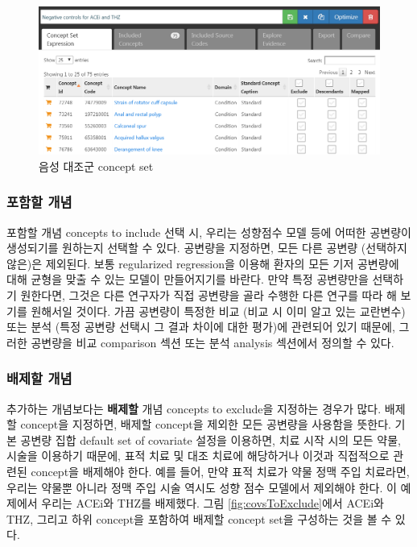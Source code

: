 \documentclass[10.5pt]{book}
\theoremstyle{definition}
\theoremstyle{definition}
\theoremstyle{definition}
\theoremstyle{remark}
\begin{document}
\begin{figure}

{\centering \includegraphics[width=1\linewidth]{images/PopulationLevelEstimation/ncConceptSet} 

}

\caption{음성 대조군 concept set}\label{fig:ncConceptSet}
\end{figure}

\subsubsection*{포함할 개념}\label{-}

포함할 개념 concepts to include 선택 시, 우리는 성향점수 모델 등에
어떠한 공변량이 생성되기를 원하는지 선택할 수 있다. 공변량을 지정하면,
모든 다른 공변량 (선택하지 않은)은 제외된다. 보통 regularized
regression을 이용해 환자의 모든 기저 공변량에 대해 균형을 맞출 수 있는
모델이 만들어지기를 바란다. 만약 특정 공변량만을 선택하기 원한다면,
그것은 다른 연구자가 직접 공변량을 골라 수행한 다른 연구를 따라 해
보기를 원해서일 것이다. 가끔 공변량이 특정한 비교 (비교 시 이미 알고
있는 교란변수) 또는 분석 (특정 공변량 선택시 그 결과 차이에 대한 평가)에
관련되어 있기 때문에, 그러한 공변량을 비교 comparison 섹션 또는 분석
analysis 섹션에서 정의할 수 있다.

\subsubsection*{배제할 개념}\label{-}

추가하는 개념보다는 \textbf{배제할} 개념 concepts to exclude을 지정하는
경우가 많다. 배제할 concept을 지정하면, 배제할 concept을 제외한 모든
공변량을 사용함을 뜻한다. 기본 공변량 집합 default set of covariate
설정을 이용하면, 치료 시작 시의 모든 약물, 시술을 이용하기 때문에, 표적
치료 및 대조 치료에 해당하거나 이것과 직접적으로 관련된 concept을
배제해야 한다. 예를 들어, 만약 표적 치료가 약물 정맥 주입 치료라면,
우리는 약물뿐 아니라 정맥 주입 시술 역시도 성향 점수 모델에서 제외해야
한다. 이 예제에서 우리는 ACEi와 THZ를 배제했다. 그림
\ref{fig:covsToExclude}에서 ACEi와 THZ, 그리고 하위 concept을 포함하여
배제할 concept set을 구성하는 것을 볼 수 있다.
\end{document}
